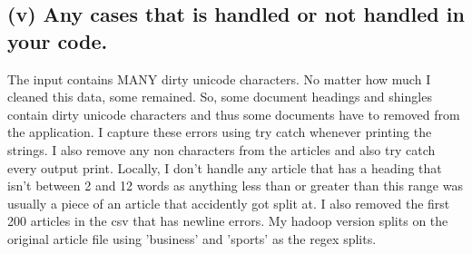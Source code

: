 \subsection*{(v) Any cases that is handled or not handled in your code.}
The input contains MANY dirty unicode characters. No matter how much I cleaned this data, some remained. So, some document headings and shingles contain dirty unicode characters and thus some documents have to removed from the application. I capture these errors using try catch whenever printing the strings. I also remove any non characters from the articles and also try catch every output print. Locally, I don't handle any article that has a heading that isn't between 2 and 12 words as anything less than or greater than this range was usually a piece of an article that accidently got split at. I also removed the first 200 articles in the csv that has newline errors. My hadoop version splits on the original article file using 'business' and 'sports' as the regex splits.



